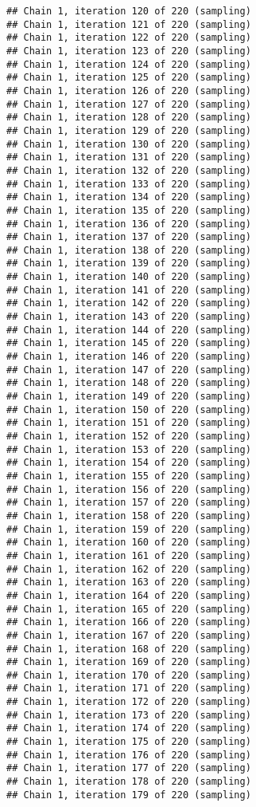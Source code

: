 \documentclass[]{book}
\begin{document}
\begin{verbatim}
## Chain 1, iteration 120 of 220 (sampling)
## Chain 1, iteration 121 of 220 (sampling)
## Chain 1, iteration 122 of 220 (sampling)
## Chain 1, iteration 123 of 220 (sampling)
## Chain 1, iteration 124 of 220 (sampling)
## Chain 1, iteration 125 of 220 (sampling)
## Chain 1, iteration 126 of 220 (sampling)
## Chain 1, iteration 127 of 220 (sampling)
## Chain 1, iteration 128 of 220 (sampling)
## Chain 1, iteration 129 of 220 (sampling)
## Chain 1, iteration 130 of 220 (sampling)
## Chain 1, iteration 131 of 220 (sampling)
## Chain 1, iteration 132 of 220 (sampling)
## Chain 1, iteration 133 of 220 (sampling)
## Chain 1, iteration 134 of 220 (sampling)
## Chain 1, iteration 135 of 220 (sampling)
## Chain 1, iteration 136 of 220 (sampling)
## Chain 1, iteration 137 of 220 (sampling)
## Chain 1, iteration 138 of 220 (sampling)
## Chain 1, iteration 139 of 220 (sampling)
## Chain 1, iteration 140 of 220 (sampling)
## Chain 1, iteration 141 of 220 (sampling)
## Chain 1, iteration 142 of 220 (sampling)
## Chain 1, iteration 143 of 220 (sampling)
## Chain 1, iteration 144 of 220 (sampling)
## Chain 1, iteration 145 of 220 (sampling)
## Chain 1, iteration 146 of 220 (sampling)
## Chain 1, iteration 147 of 220 (sampling)
## Chain 1, iteration 148 of 220 (sampling)
## Chain 1, iteration 149 of 220 (sampling)
## Chain 1, iteration 150 of 220 (sampling)
## Chain 1, iteration 151 of 220 (sampling)
## Chain 1, iteration 152 of 220 (sampling)
## Chain 1, iteration 153 of 220 (sampling)
## Chain 1, iteration 154 of 220 (sampling)
## Chain 1, iteration 155 of 220 (sampling)
## Chain 1, iteration 156 of 220 (sampling)
## Chain 1, iteration 157 of 220 (sampling)
## Chain 1, iteration 158 of 220 (sampling)
## Chain 1, iteration 159 of 220 (sampling)
## Chain 1, iteration 160 of 220 (sampling)
## Chain 1, iteration 161 of 220 (sampling)
## Chain 1, iteration 162 of 220 (sampling)
## Chain 1, iteration 163 of 220 (sampling)
## Chain 1, iteration 164 of 220 (sampling)
## Chain 1, iteration 165 of 220 (sampling)
## Chain 1, iteration 166 of 220 (sampling)
## Chain 1, iteration 167 of 220 (sampling)
## Chain 1, iteration 168 of 220 (sampling)
## Chain 1, iteration 169 of 220 (sampling)
## Chain 1, iteration 170 of 220 (sampling)
## Chain 1, iteration 171 of 220 (sampling)
## Chain 1, iteration 172 of 220 (sampling)
## Chain 1, iteration 173 of 220 (sampling)
## Chain 1, iteration 174 of 220 (sampling)
## Chain 1, iteration 175 of 220 (sampling)
## Chain 1, iteration 176 of 220 (sampling)
## Chain 1, iteration 177 of 220 (sampling)
## Chain 1, iteration 178 of 220 (sampling)
## Chain 1, iteration 179 of 220 (sampling)

\end{verbatim}
\end{document}
